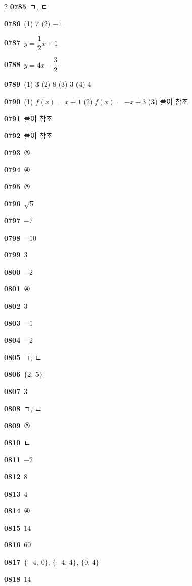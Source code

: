 \documentclass[10pt,a4paper]{article}
\begin{document}
\begin{multicols}{2}
\noindent\textbf{0785}\ ㄱ, ㄷ\par
\noindent\textbf{0786}\ (1) $7$ \quad (2) $-1$\par
\noindent\textbf{0787}\ $y=\dfrac{1}{2}x+1$\par
\noindent\textbf{0788}\ $y=4x-\dfrac{3}{2}$\par
\noindent\textbf{0789}\ (1) $3$ \quad (2) $8$ \quad (3) $3$ \quad (4) $4$\par
\noindent\textbf{0790}\ (1) $f(x)=x+1$ \quad (2) $f(x)=-x+3$ \quad (3) 풀이 참조\par
\noindent\textbf{0791}\ 풀이 참조\par
\noindent\textbf{0792}\ 풀이 참조\par
\noindent\textbf{0793}\ ③\par
\noindent\textbf{0794}\ ④\par
\noindent\textbf{0795}\ ③\par
\noindent\textbf{0796}\ $\sqrt{5}$\par
\noindent\textbf{0797}\ $-7$\par
\noindent\textbf{0798}\ $-10$\par
\noindent\textbf{0799}\ $3$\par
\noindent\textbf{0800}\ $-2$\par
\noindent\textbf{0801}\ ④\par
\noindent\textbf{0802}\ $3$\par
\noindent\textbf{0803}\ $-1$\par
\noindent\textbf{0804}\ $-2$\par
\noindent\textbf{0805}\ ㄱ, ㄷ\par
\noindent\textbf{0806}\ $\{2,\,5\}$\par
\noindent\textbf{0807}\ $3$\par
\noindent\textbf{0808}\ ㄱ, ㄹ\par
\noindent\textbf{0809}\ ③\par
\noindent\textbf{0810}\ ㄴ\par
\noindent\textbf{0811}\ $-2$\par
\noindent\textbf{0812}\ $8$\par
\noindent\textbf{0813}\ $4$\par
\noindent\textbf{0814}\ ④\par
\noindent\textbf{0815}\ $14$\par
\noindent\textbf{0816}\ $60$\par
\noindent\textbf{0817}\ $\{-4,\,0\}$, $\{-4,\,4\}$, $\{0,\,4\}$\par
\noindent\textbf{0818}\ $14$\par

\end{multicols}
\end{document}
